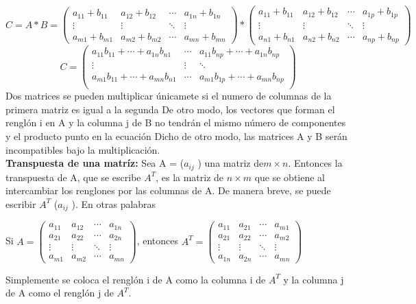 \documentclass[letter]{revtex4}
\begin{document}
    
   $$C=A*B=
       \begin{pmatrix}
        a_{11}+b_{11} & a_{12}+b_{12} & \cdots & a_{1n}+b_{1n}\\
        \vdots & \vdots & \ddots & \vdots\\
        a_{m1}+b_{m1} & a_{m2}+b_{m2} & \cdots & a_{mn}+b_{mn}
       \end{pmatrix}
       *
       \begin{pmatrix}
        a_{11}+b_{11} & a_{12}+b_{12} & \cdots & a_{1p}+b_{1p}\\
        \vdots & \vdots & \ddots & \vdots\\
        a_{n1}+b_{n1} & a_{n2}+b_{n2} & \cdots & a_{np}+b_{np}
       \end{pmatrix}$$   
    $$C= \begin{pmatrix}
        a_{11}b_{11} +\cdots+ a_{1n}b_{n1} & \cdots & a_{11}b_{np}+\cdots+a_{1n}b_{np}\\
        \vdots & \vdots & \ddots \\
        a_{m1}b_{11} +\cdots+ a_{mn}b_{n1} & \cdots & a_{m1}b_{1p}+\cdots+a_{mn}b_{np}\\
       \end{pmatrix}$$
Dos matrices  se pueden multiplicar únicamete si el numero de columnas de la primera matriz es igual a la segunda  De otro modo, los vectores que forman el renglón i en A y la columna j de B no tendrán el
mismo número de componentes y el producto punto en la ecuación Dicho de otro modo,
las matrices A y B serán incompatibles bajo la multiplicación.\\

\textbf{Transpuesta de una matríz:  }
Sea A = ($a_{ij}$ ) una matriz de$ m \times n$. Entonces la transpuesta de A, que se escribe $A^T$, es
la matriz de $n \times m$ que se obtiene al intercambiar los renglones por las columnas de A.
De manera breve, se puede escribir $A^T$ ($a_{ij}$ ). En otras palabras

  \begin{center}
    
 Si $ A=
       \begin{pmatrix}
        a_{11} & a_{12} & \cdots & a_{1n}\\
        a_{21} & a_{22} & \cdots & a_{2n}\\
        \vdots & \vdots & \ddots & \vdots\\
        a_{m1} & a_{m2} & \cdots & a_{mn}
    \end{pmatrix}
    $, entonces  $ A^T=
       \begin{pmatrix}
        a_{11} & a_{21} & \cdots & a_{m1}\\
        a_{21} & a_{22} & \cdots & a_{m2}\\
        \vdots & \vdots & \ddots & \vdots\\
        a_{1n} & a_{2n} & \cdots & a_{mn}
    \end{pmatrix}
    $
    
    Simplemente se coloca el renglón i de A como la columna i de $A^T$ y la columna j de A
como el renglón j de $A^T$.
\end{center}
\end{document}
